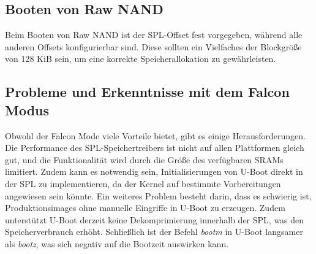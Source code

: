 \subsection{Booten von Raw NAND}
Beim Booten von Raw NAND ist der SPL-Offset fest vorgegeben, während alle anderen Offsets konfigurierbar sind. Diese sollten ein Vielfaches der Blockgröße von 128 KiB sein, um eine korrekte Speicherallokation zu gewährleisten.

\subsection{Probleme und Erkenntnisse mit dem Falcon Modus}
Obwohl der Falcon Mode viele Vorteile bietet, gibt es einige Herausforderungen. Die Performance des SPL-Speichertreibers ist nicht auf allen Plattformen gleich gut, und die Funktionalität wird durch die Größe des verfügbaren SRAMs limitiert. Zudem kann es notwendig sein, Initialisierungen von U-Boot direkt in der SPL zu implementieren, da der Kernel auf bestimmte Vorbereitungen angewiesen sein könnte. Ein weiteres Problem besteht darin, dass es schwierig ist, Produktionsimages ohne manuelle Eingriffe in U-Boot zu erzeugen. Zudem unterstützt U-Boot derzeit keine Dekomprimierung innerhalb der SPL, was den Speicherverbrauch erhöht. Schließlich ist der Befehl \textit{bootm} in U-Boot langsamer als \textit{bootz}, was sich negativ auf die Bootzeit auswirken kann.

